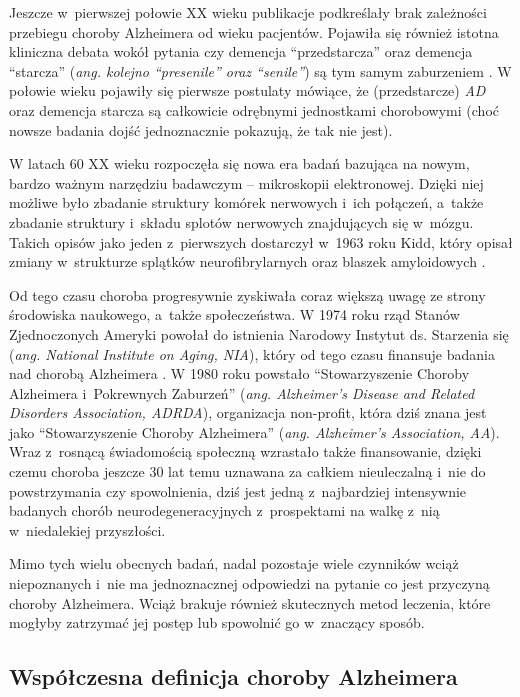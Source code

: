 Jeszcze w~pierwszej połowie XX wieku publikacje podkreślały brak zależności przebiegu choroby Alzheimera od wieku pacjentów.
Pojawiła się również istotna kliniczna debata wokół pytania czy demencja ``przedstarcza'' oraz demencja ``starcza'' (\emph{ang. kolejno ``presenile'' oraz ``senile''}) są tym samym zaburzeniem \cite{jellinger2006alzheimer}.
W połowie wieku pojawiły się pierwsze postulaty mówiące, że (przedstarcze) \emph{AD} oraz demencja starcza są całkowicie odrębnymi jednostkami chorobowymi (choć nowsze badania dojść jednoznacznie pokazują, że tak nie jest).

W latach 60 XX wieku rozpoczęła się nowa era badań bazująca na nowym, bardzo ważnym narzędziu badawczym -- mikroskopii elektronowej.
Dzięki niej możliwe było zbadanie struktury komórek nerwowych i~ich połączeń, a~także zbadanie struktury i~składu splotów nerwowych znajdujących się w~mózgu.
Takich opisów jako jeden z~pierwszych dostarczył w~1963 roku Kidd, który opisał zmiany w~strukturze splątków neurofibrylarnych oraz blaszek amyloidowych \cite{kidd1963paired}.

Od tego czasu choroba progresywnie zyskiwała coraz większą uwagę ze strony środowiska naukowego, a~także społeczeństwa.
W 1974 roku rząd Stanów Zjednoczonych Ameryki powołał do istnienia Narodowy Instytut ds. Starzenia się (\emph{ang. National Institute on Aging, NIA}), który od tego czasu finansuje badania nad chorobą Alzheimera \cite{marx1974aging}.
W 1980 roku powstało ``Stowarzyszenie Choroby Alzheimera i~Pokrewnych Zaburzeń'' (\emph{ang. Alzheimer's Disease and Related Disorders Association, ADRDA}), organizacja non-profit, która dziś znana jest jako ``Stowarzyszenie Choroby Alzheimera'' (\emph{ang. Alzheimer's Association, AA}).
Wraz z~rosnącą świadomością społeczną wzrastało także finansowanie, dzięki czemu choroba jeszcze 30 lat temu uznawana za całkiem nieuleczalną i~nie do powstrzymania czy spowolnienia, dziś jest jedną z~najbardziej intensywnie badanych chorób neurodegeneracyjnych z~prospektami na walkę z~nią w~niedalekiej przyszłości.

Mimo tych wielu obecnych badań, nadal pozostaje wiele czynników wciąż niepoznanych i~nie ma jednoznacznej odpowiedzi na pytanie co jest przyczyną choroby Alzheimera.
Wciąż brakuje również skutecznych metod leczenia, które mogłyby zatrzymać jej postęp lub spowolnić go w~znaczący sposób.

\subsection{Współczesna definicja choroby Alzheimera}

